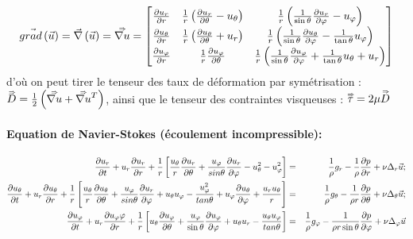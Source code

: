 $$
\vec{grad} \left( \vec{u} \right) = \vec{\nabla} \left( \vec{u} \right) =\accentset{\Rightarrow}{\nabla u}=
\begin{bmatrix}
\frac{\partial u_r}{\partial r} & \frac{1}{r} \left( \frac{\partial u_r}{\partial \theta} - u_\theta \right) & \frac{1}{r} \left( \frac{1}{\sin \theta} \frac{\partial u_r}{\partial \varphi} - u_\varphi \right) \\
\frac{\partial u_\theta}{\partial r} & \frac{1}{r} \left( \frac{\partial u_\theta}{\partial \theta} + u_r \right) & \frac{1}{r} \left( \frac{1}{\sin \theta} \frac{\partial u_\theta}{\partial \varphi} - \frac{1}{\tan \theta} u_\varphi \right) \\
\frac{\partial u_\varphi}{\partial r} & \frac{1}{r} \frac{\partial u_\varphi}{\partial \theta} &  \frac{1}{r} \left( \frac{1}{\sin \theta} \frac{\partial u_\varphi}{\partial \varphi} + \frac{1}{\tan \theta} u_\theta + u_r \right)
\end{bmatrix}
$$
\noindent d'où on peut tirer le tenseur des taux de déformation par symétrisation : $\accentset{\Rightarrow}{D}=\frac{1}{2} \left( \accentset{\Rightarrow}{\nabla u} + \accentset{\Rightarrow}{\nabla u}^T \right)$, ainsi que le tenseur des contraintes visqueuses : $\accentset{\Rightarrow}{\tau} = 2 \mu \accentset{\Rightarrow}{D}$



\paragraph{Equation de Navier-Stokes (écoulement incompressible):}




\begin{eqnarray*}
\frac {\partial u_r} {\partial t} + u_r \frac {\partial u_r} {\partial r} 
+\frac{1}{r} \left[ 
 	\frac{u_{\theta}}{r} \frac {\partial u_r} {\partial \theta} 
	+ \frac{u_{\varphi}}{sin \theta} \frac {\partial u_r} {\partial \varphi} 
	- u_{\theta}^2 - u_{\varphi}^2
	\right] 
& = &
\frac{1}{\rho} g_r - \frac{1}{\rho} \frac {\partial p} {\partial r} +  \nu \Delta_r \vec{u};
\\
\frac {\partial u_{\theta}} {\partial t} 
+ u_r \frac {\partial u_{\theta}} {\partial r} 
+ \frac{1}{r} \left[ 
		\frac{u_{\theta}}{r} \frac {\partial u_{\theta}} {\partial \theta} 
		+ \frac{u_{\varphi}}{sin \theta} \frac {\partial u_r} {\partial \varphi} 
		+ u_\theta u_\varphi - \frac{u_\varphi^2}{tan \theta} 
		+ u_\varphi \frac {\partial u_{\theta}} {\partial \varphi} + \frac{u_r u_{\theta}}{r}
		\right] 
& = &
\frac{1}{\rho} g_{\theta} - \frac{1}{\rho r} \frac {\partial p} {\partial \theta} 
 +  \nu \Delta_\theta \vec{u}; 
 \\
\frac {\partial u_\varphi} {\partial t} + u_r \frac {\partial u_\varphi\varphi} {\partial r} 
+\frac{1}{r} \left[ 
	u_{\theta} \frac {\partial u_\varphi} {\partial \theta} 
	+ \frac{u_\varphi}{\sin \theta} \frac {\partial u_\varphi} {\partial \varphi} 
	+ u_\theta u_r - \frac{u_\theta u_\varphi}{tan \theta} 
		\right] 
&=&
\frac{1}{\rho} g_\varphi - \frac{1}{\rho r \sin \theta} \frac {\partial p} {\partial \varphi} + \nu \Delta_\varphi \vec{u}
\end{eqnarray*}



